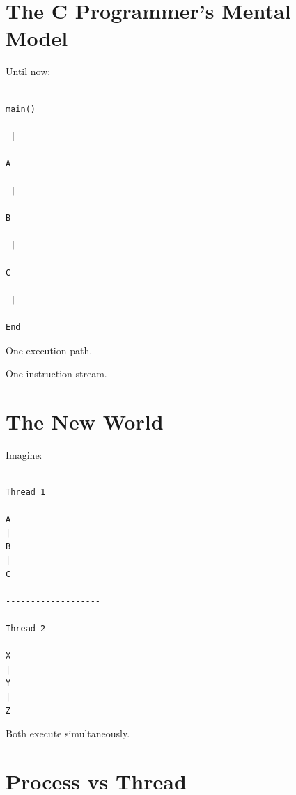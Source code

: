 \documentclass[11pt,a4paper]{book}
\begin{document}

\section{The C Programmer's Mental Model}

Until now:

\begin{verbatim}

main()

 |

A

 |

B

 |

C

 |

End

\end{verbatim}


One execution path.


One instruction stream.


\section{The New World}

Imagine:

\begin{verbatim}

Thread 1

A
|
B
|
C

-------------------

Thread 2

X
|
Y
|
Z

\end{verbatim}


Both execute simultaneously.


\section{Process vs Thread}
\end{document}
